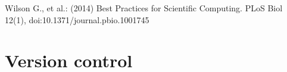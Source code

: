 \documentclass{beamer}
\begin{document}
\begin{frame}[t]
\begin{columns}
\begin{column}{.23\linewidth}
\begin{block}{}
\begin{minipage}[t][\blockheight][t]{\linewidth}
\begin{enumerate}
                    \end{enumerate}
                \end{minipage}
            \end{block}
        \end{column}
    \end{columns}
\vspace{2mm}
\scriptsize Wilson G., et al.: (2014) Best Practices for Scientific Computing. PLoS Biol 12(1), doi:10.1371/journal.pbio.1001745
\end{frame}

\section{Version control}
\end{document}
